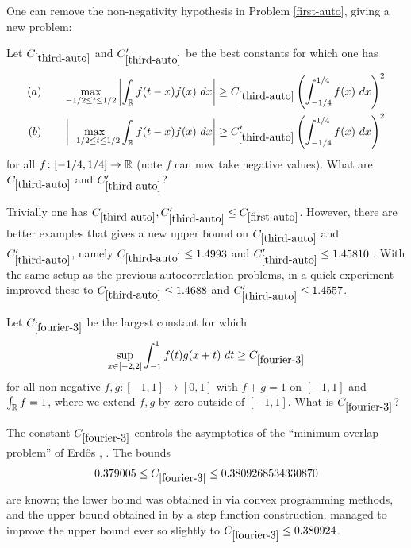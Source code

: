 One can remove the non-negativity hypothesis in Problem \ref{first-auto}, giving a new problem:

\renewcommand{\problemURL}{https://google-deepmind.github.io/alphaevolve_repository_of_problems/problems/4.html}

\begin{problem}\label{third-auto}
Let $C_{\ref{third-auto}}$ and $C'_{\ref{third-auto}}$ be the best constants for which one has
\begin{align*}
    (a) \qquad\max_{-1/2 \leq t \leq 1/2}\left |\int_\R f(t-x) f(x)\ dx\right| &\geq C_{\ref{third-auto}} \left(\int_{-1/4}^{1/4} f(x)\ dx\right)^2\\
    (b) \qquad\left |\max_{-1/2 \leq t \leq 1/2}\int_\R f(t-x) f(x)\ dx\right| &\geq C'_{\ref{third-auto}} \left(\int_{-1/4}^{1/4} f(x)\ dx\right)^2
\end{align*}
for all $f \colon [-1/4,1/4] \to \mathbb{R}$ (note $f$ can now take negative values).  What are $C_{\ref{third-auto}}$ and $C_{\ref{third-auto}}'$?
\end{problem}

Trivially one has $C_{\ref{third-auto}}, C_{\ref{third-auto}}'  \leq C_{\ref{first-auto}}$.  However, there are better examples that gives a new upper bound on $C_{\ref{third-auto}}$ and $C_{\ref{third-auto}}'$, namely $C_{\ref{third-auto}} \leq 1.4993$ \cite{matolcsi-vinuesa} and $C_{\ref{third-auto}}' \leq 1.45810$ \cite{vinuesageneralized}. With the same setup as the previous autocorrelation problems, in a quick experiment \AlphaEvolve improved these to $C_{\ref{third-auto}} \leq 1.4688$ and  $C_{\ref{third-auto}}' \leq 1.4557$.








\renewcommand{\problemURL}{https://google-deepmind.github.io/alphaevolve_repository_of_problems/problems/5.html}


\begin{problem}\label{fourier-3}
Let $C_{\ref{fourier-3}}$ be the largest constant for which
$$ \sup_{x \in [-2,2]} \int_{-1}^1 f(t) g(x+t)\ dt\geq C_{\ref{fourier-3}}$$
for all non-negative $f,g: [-1,1] \to [0,1]$ with $f+g=1$ on $[-1,1]$ and $\int_{\mathbb{R}} f = 1$, where we extend $f,g$ by zero outside of $[-1,1]$.  What is 
$C_{\ref{fourier-3}}$?
\end{problem}

The constant $C_{\ref{fourier-3}}$ controls the asymptotics of the ``minimum overlap problem'' of Erd\H{o}s \cite{erdos-overlap}, \cite[Problem 36]{erdosproblems}.  The bounds
$$ 0.379005 \leq C_{\ref{fourier-3}} \leq 0.3809268534330870$$
are known; the lower bound was obtained in \cite{White-2} via convex programming methods, and the upper bound obtained in \cite{haugland} by a step function construction. \AlphaEvolve managed to improve the upper bound ever so slightly to $C_{\ref{fourier-3}} \leq 0.380924$.


